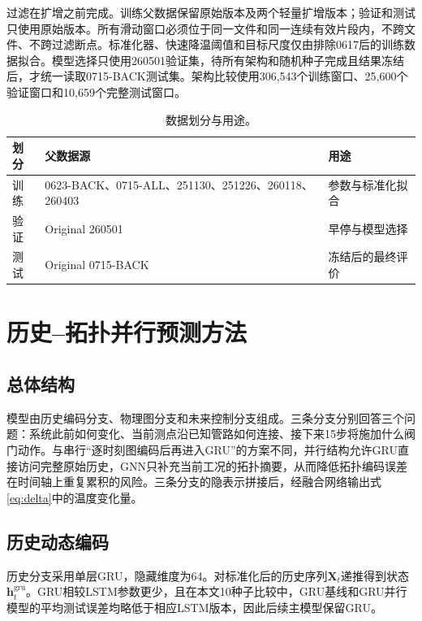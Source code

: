 \documentclass[a4paper,fleqn]{cas-dc}
\newcommand{\vect}[1]{\boldsymbol{#1}}
\begin{document}
过滤在扩增之前完成。训练父数据保留原始版本及两个轻量扩增版本；验证和测试只使用原始版本。所有滑动窗口必须位于同一文件和同一连续有效片段内，不跨文件、不跨过滤断点。标准化器、快速降温阈值和目标尺度仅由排除0617后的训练数据拟合。模型选择只使用260501验证集，待所有架构和随机种子完成且结果冻结后，才统一读取0715-BACK测试集。架构比较使用306,543个训练窗口、25,600个验证窗口和10,659个完整测试窗口。

\begin{table}[t]
\centering
\caption{数据划分与用途。}
\label{tab:split}
\begin{tabular}{@{}p{1.45cm}p{4.1cm}p{1.8cm}@{}}
\toprule
划分 & 父数据源 & 用途 \\
\midrule
训练 & 0623-BACK、0715-ALL、251130、251226、260118、260403 & 参数与标准化拟合 \\
验证 & Original 260501 & 早停与模型选择 \\
测试 & Original 0715-BACK & 冻结后的最终评价 \\
\bottomrule
\end{tabular}
\end{table}

\section{历史--拓扑并行预测方法}\label{sec:method}

\subsection{总体结构}

模型由历史编码分支、物理图分支和未来控制分支组成。三条分支分别回答三个问题：系统此前如何变化、当前测点沿已知管路如何连接、接下来15步将施加什么阀门动作。与串行“逐时刻图编码后再进入GRU”的方案不同，并行结构允许GRU直接访问完整原始历史，GNN只补充当前工况的拓扑摘要，从而降低拓扑编码误差在时间轴上重复累积的风险。三条分支的隐表示拼接后，经融合网络输出式\eqref{eq:delta}中的温度变化量。

\subsection{历史动态编码}

历史分支采用单层GRU，隐藏维度为64。对标准化后的历史序列$\vect X_t$递推得到状态$\vect h_t^{\mathrm{gru}}$。GRU相较LSTM参数更少，且在本文10种子比较中，GRU基线和GRU并行模型的平均测试误差均略低于相应LSTM版本，因此后续主模型保留GRU。
\end{document}
